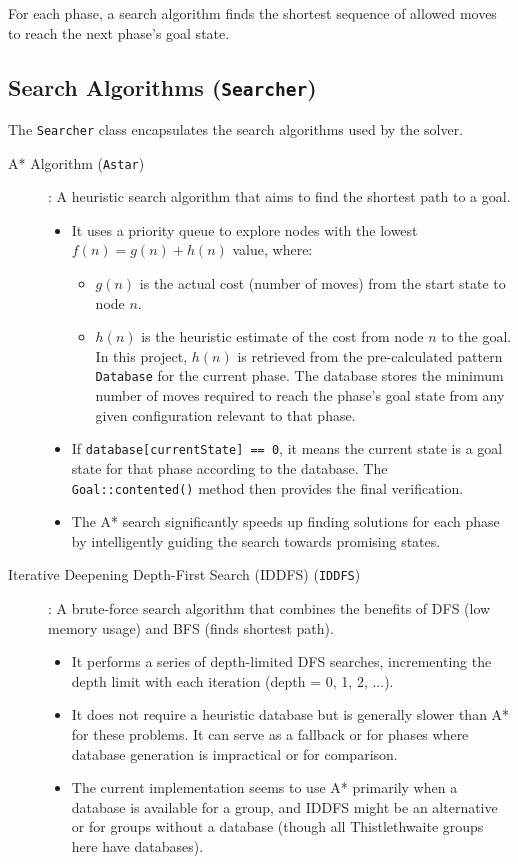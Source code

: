 \documentclass[11pt, a4paper]{article}
\begin{document}
For each phase, a search algorithm finds the shortest sequence of allowed moves to reach the next phase's goal state.

\subsection{Search Algorithms (\texttt{Searcher})}
The \texttt{Searcher} class encapsulates the search algorithms used by the solver.
\begin{description}
    \item[A* Algorithm (\texttt{Astar})]:
    A heuristic search algorithm that aims to find the shortest path to a goal.
    \begin{itemize}
        \item It uses a priority queue to explore nodes with the lowest $f(n) = g(n) + h(n)$ value, where:
            \begin{itemize}
                \item $g(n)$ is the actual cost (number of moves) from the start state to node $n$.
                \item $h(n)$ is the heuristic estimate of the cost from node $n$ to the goal. In this project, $h(n)$ is retrieved from the pre-calculated pattern \texttt{Database} for the current phase. The database stores the minimum number of moves required to reach the phase's goal state from any given configuration relevant to that phase.
            \end{itemize}
        \item If \texttt{database[currentState] == 0}, it means the current state is a goal state for that phase according to the database. The \texttt{Goal::contented()} method then provides the final verification.
        \item The A* search significantly speeds up finding solutions for each phase by intelligently guiding the search towards promising states.
    \end{itemize}
    \item[Iterative Deepening Depth-First Search (IDDFS) (\texttt{IDDFS})]:
    A brute-force search algorithm that combines the benefits of DFS (low memory usage) and BFS (finds shortest path).
    \begin{itemize}
        \item It performs a series of depth-limited DFS searches, incrementing the depth limit with each iteration (depth = 0, 1, 2, ...).
        \item It does not require a heuristic database but is generally slower than A* for these problems. It can serve as a fallback or for phases where database generation is impractical or for comparison.
        \item The current implementation seems to use A* primarily when a database is available for a group, and IDDFS might be an alternative or for groups without a database (though all Thistlethwaite groups here have databases).
    \end{itemize}
\end{description}
\end{document}
